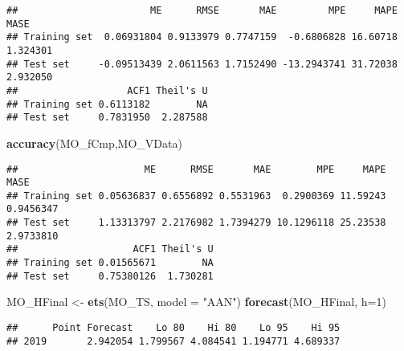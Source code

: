 \documentclass[
]{article}
\newenvironment{Shaded}{\begin{snugshade}}{\end{snugshade}}
\newcommand{\CommentTok}[1]{\textcolor[rgb]{0.56,0.35,0.01}{\textit{#1}}}
\newcommand{\DataTypeTok}[1]{\textcolor[rgb]{0.13,0.29,0.53}{#1}}
\newcommand{\DecValTok}[1]{\textcolor[rgb]{0.00,0.00,0.81}{#1}}
\newcommand{\KeywordTok}[1]{\textcolor[rgb]{0.13,0.29,0.53}{\textbf{#1}}}
\newcommand{\NormalTok}[1]{#1}
\newcommand{\OperatorTok}[1]{\textcolor[rgb]{0.81,0.36,0.00}{\textbf{#1}}}
\newcommand{\StringTok}[1]{\textcolor[rgb]{0.31,0.60,0.02}{#1}}
\begin{document}
\begin{verbatim}
##                       ME      RMSE       MAE         MPE     MAPE     MASE
## Training set  0.06931804 0.9133979 0.7747159  -0.6806828 16.60718 1.324301
## Test set     -0.09513439 2.0611563 1.7152490 -13.2943741 31.72038 2.932050
##                   ACF1 Theil's U
## Training set 0.6113182        NA
## Test set     0.7831950  2.287588
\end{verbatim}

\begin{Shaded}
\begin{Highlighting}[]
\KeywordTok{accuracy}\NormalTok{(MO_fCmp,MO_VData)}
\end{Highlighting}
\end{Shaded}

\begin{verbatim}
##                      ME      RMSE       MAE        MPE     MAPE      MASE
## Training set 0.05636837 0.6556892 0.5531963  0.2900369 11.59243 0.9456347
## Test set     1.13313797 2.2176982 1.7394279 10.1296118 25.23538 2.9733810
##                    ACF1 Theil's U
## Training set 0.01565671        NA
## Test set     0.75380126  1.730281
\end{verbatim}

\begin{Shaded}
\begin{Highlighting}[]
\NormalTok{MO_HFinal <-}\StringTok{ }\KeywordTok{ets}\NormalTok{(MO_TS, }\DataTypeTok{model =} \StringTok{"AAN"}\NormalTok{)}
\KeywordTok{forecast}\NormalTok{(MO_HFinal, }\DataTypeTok{h=}\DecValTok{1}\NormalTok{)}
\end{Highlighting}
\end{Shaded}

\begin{verbatim}
##      Point Forecast    Lo 80    Hi 80    Lo 95    Hi 95
## 2019       2.942054 1.799567 4.084541 1.194771 4.689337
\end{verbatim}

\begin{Shaded}
\end{Shaded}
\end{document}
